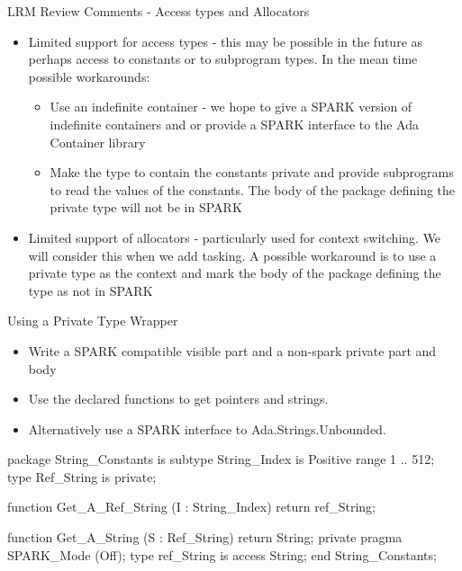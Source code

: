 \documentclass{beamer}
\begin{document}
\begin{frame}{LRM Review Comments - Access types and Allocators}

  \begin{itemize}

  \item Limited support for access types - this may be possible in the
    future as perhaps access to constants or to subprogram types. In
    the mean time possible workarounds:
   \begin{itemize}
    \item Use an indefinite container - we hope to give a SPARK
      version of indefinite containers and or provide a SPARK
      interface to the Ada Container library
   \item Make the type to contain the constants private and provide
     subprograms to read the values of the constants. The body of the
     package defining the private type will not be in SPARK
  \end{itemize}
  \item Limited support of allocators - particularly used for context
    switching.  We will consider this when we add tasking. A possible
    workaround is to use a private type as the context and mark the
    body of the package defining the type as not in SPARK
  \end{itemize}

\end{frame}

\begin{frame}[fragile]{Using a Private Type Wrapper}

  \begin{itemize}

    \item Write a SPARK compatible visible part and a non-spark private part and body
    \item Use the declared functions to get pointers and strings.
    \item Alternatively use a SPARK interface to Ada.Strings.Unbounded. 
  \end{itemize}

  \begin{pxcode}[language=SPARK,style=tinystyle,gobble=4]
    package String_Constants
    is
        subtype String_Index is Positive range 1 .. 512;
        type Ref_String is private;

        function Get_A_Ref_String (I : String_Index) return ref_String;

        function Get_A_String (S : Ref_String) return String;
    private
       pragma SPARK_Mode (Off);
       type ref_String is access String;
   end String_Constants; 
  \end{pxcode}

\end{frame}
\end{document}
